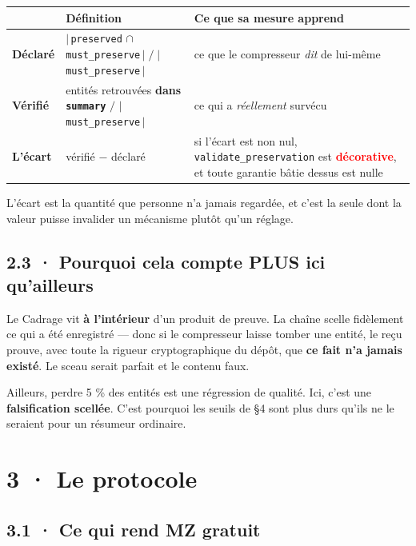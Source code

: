 \documentclass[10pt]{article}
\newcommand{\pire}[1]{\textcolor{red}{\textbf{#1}}}
\newcommand{\code}[1]{\texttt{\small #1}}
\begin{document}
\begin{center}\small
\renewcommand{\arraystretch}{1.25}
\begin{tabular}{@{}>{\raggedright\arraybackslash}p{3.4cm} >{\raggedright\arraybackslash}p{6.4cm} >{\raggedright\arraybackslash}p{6.0cm}@{}}
\toprule
& \textbf{Définition} & \textbf{Ce que sa mesure apprend} \\
\midrule
\textbf{Déclaré} & $|\,$\code{preserved} $\cap$ \code{must\_preserve}$\,| \;/\; |\,$\code{must\_preserve}$\,|$ & ce que le compresseur \emph{dit} de lui-même \\
\textbf{Vérifié} & entités retrouvées \textbf{dans \code{summary}} $/$ $|\,$\code{must\_preserve}$\,|$ & ce qui a \emph{réellement} survécu \\
\textbf{L'écart} & vérifié $-$ déclaré & si l'écart est non nul, \code{validate\_preservation} est \pire{décorative}, et toute garantie bâtie dessus est nulle \\
\bottomrule
\end{tabular}
\end{center}

L'écart est la quantité que personne n'a jamais regardée, et c'est la seule dont la valeur puisse
invalider un mécanisme plutôt qu'un réglage.

\subsection{2.3 · Pourquoi cela compte PLUS ici qu'ailleurs}

\begin{these}
\small Le Cadrage vit \textbf{à l'intérieur} d'un produit de preuve. La chaîne scelle fidèlement ce
qui a été enregistré --- donc si le compresseur laisse tomber une entité, le reçu prouve, avec toute
la rigueur cryptographique du dépôt, que \textbf{ce fait n'a jamais existé}. Le sceau serait parfait
et le contenu faux.

Ailleurs, perdre 5 \% des entités est une régression de qualité. Ici, c'est une
\textbf{falsification scellée}. C'est pourquoi les seuils de §4 sont plus durs qu'ils ne le seraient
pour un résumeur ordinaire.
\end{these}

\section{3 · Le protocole}

\subsection{3.1 · Ce qui rend MZ gratuit}
\end{document}
